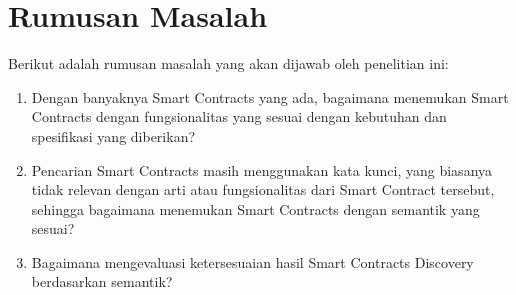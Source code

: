 
\section{Rumusan Masalah}
\label{sec:rumusan-masalah}

Berikut adalah rumusan masalah yang akan dijawab oleh penelitian ini:
\begin{enumerate}
  \item Dengan banyaknya Smart Contracts yang ada, bagaimana menemukan Smart Contracts dengan fungsionalitas yang sesuai dengan kebutuhan dan spesifikasi yang diberikan?
  \item Pencarian Smart Contracts masih menggunakan kata kunci, yang biasanya tidak relevan dengan arti atau fungsionalitas dari Smart Contract tersebut, sehingga bagaimana menemukan Smart Contracts dengan semantik yang sesuai?
  \item Bagaimana mengevaluasi ketersesuaian hasil Smart Contracts Discovery berdasarkan semantik?
\end{enumerate}



